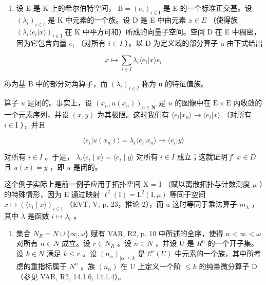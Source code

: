 \begin{enumerate}
\def\labelenumi{\arabic{enumi})}
\setcounter{enumi}{1}
\tightlist
\item
  设 E 是 K 上的希尔伯特空间， \(\mathrm{B} = (e_i)_{i \in \mathrm{I}}\) 是 E 的一个标准正交基。设 \((\lambda_i)_{i \in \mathrm{I}}\) 是 K 中元素的一个族。设 D 是 E 中由元素 \(x \in E\) （使得族 \((\lambda_i \langle e_i | x \rangle)_{i \in \mathrm{I}}\) 在 K 中平方可和）所成的向量子空间。空间 D 在 E 中稠密，因为它包含向量 \(e_i\) （对所有 \(i \in I\) ）。以 D 为定义域的部分算子 u 由下式给出
\end{enumerate}

\[
x \mapsto \sum_ {i \in I} \lambda_ {i} \langle e _ {i} | x \rangle e _ {i}
\]

称为基 B 中的部分对角算子，而 \((\lambda_{i})_{i\in I}\) 称为 u 的特征值族。

算子 \(u\) 是闭的。事实上，设 \((x_{n}, u(x_{n}))_{n \in \mathbf{N}}\) 是 \(u\) 的图像中在 \(\mathrm{E} \times \mathrm{E}\) 内收敛的一个元素序列，并设 \((x, y)\) 为其极限。这时我们有 \(\langle e_{i} | x_{n} \rangle \to \langle e_{i} | x \rangle\) （对所有 \(i \in \mathrm{I}\) ），并且

\[
\langle e _ {i} | u (x _ {n}) \rangle = \lambda_ {i} \langle e _ {i} | x _ {n} \rangle \rightarrow \langle e _ {i} | y \rangle
\]

对所有 \(i \in I\) 。于是， \(\lambda_{i} \langle e_{i} \mid x \rangle = \langle e_{i} \mid y \rangle\) 对所有 \(i \in I\) 成立；这就证明了 \(x \in D\) 且 \(u(x) = y\) ，即 \(u\) 是闭的。

这个例子实际上是前一例子应用于拓扑空间 X = I （赋以离散拓扑与计数测度 \(\mu\) ）的特殊情形，因为 E 通过映射 \(\ell^{2}(\mathrm{I}) = \mathrm{L}^{2}(\mathrm{I}, \mu)\) 等同于空间 \(x \mapsto (\langle e_{i} \mid x \rangle)_{i \in \mathrm{I}}\) （EVT, V, p. 23，推论 2），而 u 这时等同于乘法算子 \(m_{\lambda}\) ，其中 \(\lambda\) 是函数 \(i \mapsto \lambda_{i}\) 。

\begin{enumerate}
\def\labelenumi{\arabic{enumi})}
\setcounter{enumi}{2}
\tightlist
\item
  集合 \(N_{R} = N \cup \{\infty, \omega\}\) 赋有 VAR, R2, p. 10 中所述的全序，使得 \(n < \infty < \omega\) 对所有 \(n \in N\) 成立。设 \(r \in N_{R}\) 。设 \(n \in N\) ，并设 U 是 \(R^{n}\) 的一个开子集。设 \(k \in N\) 满足 \(k \leqslant r\) 。设 \((n_{\alpha})_{|\alpha| \leqslant k}\) 是 \(\mathcal{C}^{r}(U)\) 中元素的一个族，其中所考虑的重指标属于 \(N^{n}\) 。族 \((n_{\alpha})\) 在 U 上定义一个阶 \(\leqslant k\) 的纯量微分算子 D （参见 VAR, R2, 14.1.6, 14.1.4）。
\end{enumerate}

